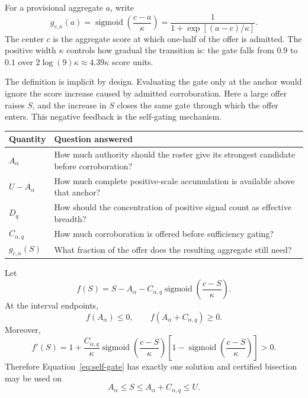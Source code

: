 \documentclass[11pt]{article}
\newcommand{\sigmoid}{\operatorname{sigmoid}}
\begin{document}
For a provisional aggregate $a$, write
\begin{equation}
g_{c,\kappa}(a)
=
\sigmoid\left(\frac{c-a}{\kappa}\right)
=
\frac{1}{1+\exp[(a-c)/\kappa]}.
\end{equation}
The center $c$ is the aggregate score at which one-half of the offer is
admitted. The positive width $\kappa$ controls how gradual the transition is:
the gate falls from $0.9$ to $0.1$ over
$2\log(9)\kappa\approx4.39\kappa$ score units.

The definition is implicit by design. Evaluating the gate only at the anchor
would ignore the score increase caused by admitted corroboration. Here a large
offer raises $S$, and the increase in $S$ closes the same gate through which
the offer enters. This negative feedback is the self-gating mechanism.

\begin{center}
\small
\begin{tabularx}{0.94\textwidth}{@{}p{}>{\raggedright\arraybackslash}X@{}}
\toprule
Quantity & Question answered \\
\midrule
$A_\alpha$ & How much authority should the roster give its strongest
candidate before corroboration? \\
$U-A_\alpha$ & How much complete positive-scale accumulation is available
above that anchor? \\
$D_q$ & How should the concentration of positive signal count as effective
breadth? \\
$C_{\alpha,q}$ & How much corroboration is offered before sufficiency gating? \\
$g_{c,\kappa}(S)$ & What fraction of the offer does the resulting aggregate
still need? \\
\bottomrule
\end{tabularx}
\end{center}

Let
\[
f(S)=S-A_\alpha-C_{\alpha,q}
\sigmoid\left(\frac{c-S}{\kappa}\right).
\]
At the interval endpoints,
\[
f(A_\alpha)\leq0,\qquad
f(A_\alpha+C_{\alpha,q})\geq0.
\]
Moreover,
\[
f'(S)
=1+\frac{C_{\alpha,q}}{\kappa}
\sigmoid\left(\frac{c-S}{\kappa}\right)
\left[1-\sigmoid\left(\frac{c-S}{\kappa}\right)\right]
>0.
\]
Therefore Equation~\eqref{eq:self-gate} has exactly one solution and certified
bisection may be used on
\begin{equation}
A_\alpha\leq S\leq A_\alpha+C_{\alpha,q}\leq U.
\label{eq:bounds}
\end{equation}
\end{document}
